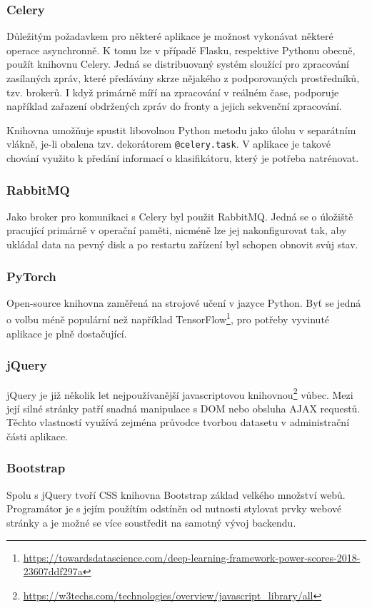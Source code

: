 \documentclass[
  field=ainfp,
  master=true,
  biblatex,
  sourcecodes=false,
  theorems=false,
  glossaries,
  index
]{kidiplom}
\begin{document}
\subsubsection*{Celery}
Důležitým požadavkem pro některé aplikace je možnost vykonávat některé ope\-race asynchronně. K tomu lze v případě Flasku, respektive Pythonu obecně, použít knihovnu Celery. Jedná se distribuovaný systém sloužící pro zpracování zasílaných zpráv, které předávány skrze nějakého z podporovaných prostředníků, tzv. brokerů. I když primárně míří na zpracování v reálném čase, podporuje například zařazení obdržených zpráv do fronty a jejich sekvenční zpracování.

Knihovna umožňuje spustit libovolnou Python metodu jako úlohu v separátním vlákně, je-li obalena tzv. dekorátorem \texttt{@celery.task}. V aplikace je takové chování využito k předání informací o klasifikátoru, který je potřeba natrénovat.

\subsubsection*{RabbitMQ}
Jako broker pro komunikaci s Celery byl použit RabbitMQ. Jedná se o úložiště pracující primárně v operační paměti, nicméně lze jej nakonfigurovat tak, aby ukládal data na pevný disk a po restartu zařízení byl schopen obnovit svůj stav.

\subsubsection*{PyTorch}
Open-source knihovna zaměřená na strojové učení v jazyce Python. Byť se jedná o volbu méně populární než například TensorFlow\footnote{\url{https://towardsdatascience.com/deep-learning-framework-power-scores-2018-23607ddf297a}}, pro potřeby vyvinuté aplikace je plně dostačující.


\subsubsection*{jQuery}
jQuery je již několik let nejpoužívanější javascriptovou knihovnou\footnote{\url{https://w3techs.com/technologies/overview/javascript\_library/all}} vůbec. Mezi její silné stránky patří snadná manipulace s DOM nebo obsluha AJAX requestů. Těchto vlastností využívá zejména průvodce tvorbou datasetu v administrační části aplikace.

\subsubsection*{Bootstrap}
Spolu s jQuery tvoří CSS knihovna Bootstrap základ velkého množství webů. Programátor je s jejím použítím odstíněn od nutnosti stylovat prvky webové stránky a je možné se více soustředit na samotný vývoj backendu.
\end{document}
